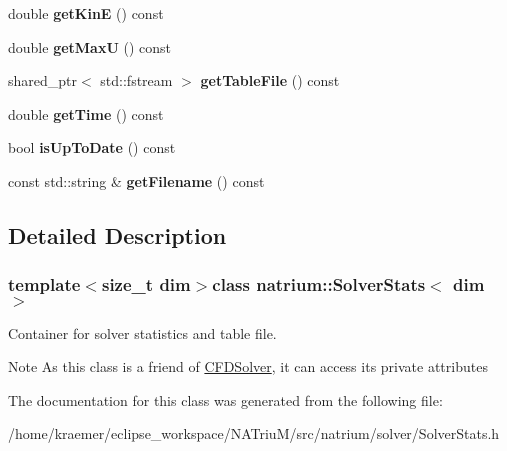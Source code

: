 \begin{DoxyCompactItemize}
\item 
\hypertarget{classnatrium_1_1SolverStats_a24d2637fa64a779c0f01820ae7e0dfa6}{double {\bfseries get\-Kin\-E} () const }\label{classnatrium_1_1SolverStats_a24d2637fa64a779c0f01820ae7e0dfa6}

\item 
\hypertarget{classnatrium_1_1SolverStats_ac880e86e2e93cafad88fa447ebb641b5}{double {\bfseries get\-Max\-U} () const }\label{classnatrium_1_1SolverStats_ac880e86e2e93cafad88fa447ebb641b5}

\item 
\hypertarget{classnatrium_1_1SolverStats_ae4ab93dfcac8500e41afe4d14b485a3a}{shared\-\_\-ptr$<$ std\-::fstream $>$ {\bfseries get\-Table\-File} () const }\label{classnatrium_1_1SolverStats_ae4ab93dfcac8500e41afe4d14b485a3a}

\item 
\hypertarget{classnatrium_1_1SolverStats_a7eb7473ffe34d624bb8c09666021a6e8}{double {\bfseries get\-Time} () const }\label{classnatrium_1_1SolverStats_a7eb7473ffe34d624bb8c09666021a6e8}

\item 
\hypertarget{classnatrium_1_1SolverStats_ade0d711e048a834547ad32643bc2b529}{bool {\bfseries is\-Up\-To\-Date} () const }\label{classnatrium_1_1SolverStats_ade0d711e048a834547ad32643bc2b529}

\item 
\hypertarget{classnatrium_1_1SolverStats_aedf3ce8027cba3da15c8b28241234c94}{const std\-::string \& {\bfseries get\-Filename} () const }\label{classnatrium_1_1SolverStats_aedf3ce8027cba3da15c8b28241234c94}

\end{DoxyCompactItemize}


\subsection{Detailed Description}
\subsubsection*{template$<$size\-\_\-t dim$>$class natrium\-::\-Solver\-Stats$<$ dim $>$}

Container for solver statistics and table file. 

\begin{DoxyNote}{Note}
As this class is a friend of \hyperlink{classnatrium_1_1CFDSolver}{C\-F\-D\-Solver}, it can access its private attributes 
\end{DoxyNote}


The documentation for this class was generated from the following file\-:\begin{DoxyCompactItemize}
\item 
/home/kraemer/eclipse\-\_\-workspace/\-N\-A\-Triu\-M/src/natrium/solver/Solver\-Stats.\-h\end{DoxyCompactItemize}
